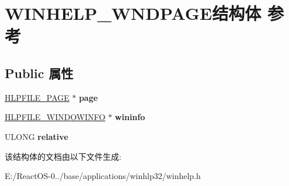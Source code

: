 \hypertarget{struct_w_i_n_h_e_l_p___w_n_d_p_a_g_e}{}\section{W\+I\+N\+H\+E\+L\+P\+\_\+\+W\+N\+D\+P\+A\+G\+E结构体 参考}
\label{struct_w_i_n_h_e_l_p___w_n_d_p_a_g_e}
\subsection*{Public 属性}
\begin{DoxyCompactItemize}
\item 
\mbox{\label{struct_w_i_n_h_e_l_p___w_n_d_p_a_g_e_ab99ec685705fa6b18ae498065bdba836}} 
\hyperlink{structtag_hlp_file_page}{H\+L\+P\+F\+I\+L\+E\+\_\+\+P\+A\+GE} $\ast$ {\bfseries page}
\item 
\mbox{\label{struct_w_i_n_h_e_l_p___w_n_d_p_a_g_e_a86b1e970ed16762120263672a24f701e}} 
\hyperlink{struct_h_l_p_f_i_l_e___w_i_n_d_o_w_i_n_f_o}{H\+L\+P\+F\+I\+L\+E\+\_\+\+W\+I\+N\+D\+O\+W\+I\+N\+FO} $\ast$ {\bfseries wininfo}
\item 
\mbox{\label{struct_w_i_n_h_e_l_p___w_n_d_p_a_g_e_a3634bef144b2626f019142221dd22b43}} 
U\+L\+O\+NG {\bfseries relative}
\end{DoxyCompactItemize}


该结构体的文档由以下文件生成\+:\begin{DoxyCompactItemize}
\item 
E\+:/\+React\+O\+S-\/0../base/applications/winhlp32/winhelp.\+h\end{DoxyCompactItemize}

